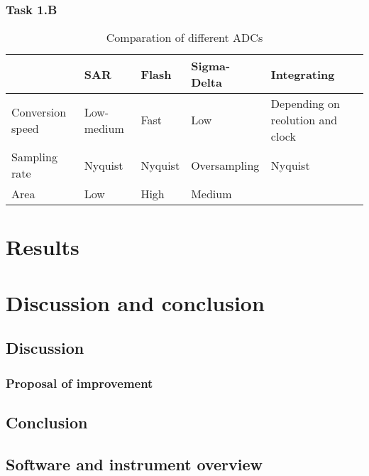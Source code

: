 \documentclass[english, 12pt, a4paper]{ifimaster}
\begin{document}
\subsection{Task 1.B}
\begin{table}[]
\centering
\caption{Comparation of different ADCs}
\label{comp:adc}
\begin{tabular}{|l|l|l|l|l|}
\hline
                 & SAR        & Flash   & Sigma-Delta  & Integrating                      \\ \hline
Conversion speed & Low-medium & Fast    & Low          & Depending on reolution and clock \\ \hline
Sampling rate    & Nyquist    & Nyquist & Oversampling & Nyquist                          \\ \hline
Area             & Low        & High    & Medium       &                                  \\ \hline
\end{tabular}
\end{table}



\chapter{Results} 
\chapter{Discussion and conclusion}
\section{Discussion}
\subsection{Proposal of improvement}
\section{Conclusion}

\backmatter{}


\begin{appendices}
\chapter{Software and instrument overview}
\end{appendices}

\printbibliography{}
\end{document}
